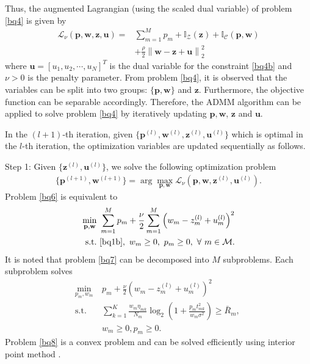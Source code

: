 \documentclass[journal]{IEEEtran}
\begin{document}
Thus, the augmented Lagrangian (using the scaled dual variable) of problem \eqref{bq4} is given by
\begin{align}
\mathcal{L}_\nu\left(\mathbf{p},\mathbf{w}, \mathbf{z},\mathbf{u}\right)=& \sum\limits_{m=1}^{M} p_m + \mathbb{I}_\mathcal{Z}\left(\mathbf{z}\right) + \mathbb{I}_\mathcal{C}\left(\mathbf{p},\mathbf{w}\right)\nonumber \\ & +\frac{\rho}{2}\left\|\mathbf{w} - \mathbf{z} + \mathbf{u}\right\|_2^2
\end{align}
where $\mathbf{u} = [u_1, u_2, \cdots, u_N]^T$ is the dual variable for the  constraint \eqref{bq4b} and $\nu>0$ is the penalty parameter. From problem \eqref{bq4}, it is observed that the variables can be split into two groups: $\{\mathbf{p}, \mathbf{w}\}$ and $\mathbf{z}$. Furthermore, the objective function can be separable accordingly. Therefore, the ADMM algorithm can be applied to solve problem \eqref{bq4} by iteratively updating $\mathbf{p}, \mathbf{w}$, $\mathbf{z}$ and $\mathbf{u}$.

In the $(l+1)$-th iteration, given $\{\mathbf{p}^{(l)}, \mathbf{w}^{(l)}, \mathbf{z}^{(l)}, \mathbf{u}^{(l)}\}$ which is optimal in the $l$-th iteration, the optimization variables are updated sequentially as follows.

Step 1: Given $\{\mathbf{z}^{(l)}, \mathbf{u}^{(l)}\}$, we solve the following optimization problem
\begin{align}\label{bq6}
\{\mathbf{p}^{(l+1)}, \mathbf{w}^{(l+1)}\} = \arg \max_{\mathbf{p}, \mathbf{w}} \mathcal{L}_\nu\left(\mathbf{p}, \mathbf{w}, \mathbf{z}^{(l)}, \mathbf{u}^{(l)}\right).
\end{align}
Problem \eqref{bq6} is equivalent to
\begin{align}\label{bq7}
\min_{\mathbf{p}, \mathbf{w}}\ & \sum\limits_{m=1}^{M} p_m + \frac{\nu}{2}\sum\limits_{m=1}^{M}\left(w_m-z_m^{(l)}+u_m^{(l)}\right)^2 \nonumber\\ \mbox{s.t.}\ &  \eqref{bq1b},\ w_m\geq 0,\ p_m\geq 0,\ \forall\ m\in\mathcal{M}.
\end{align}
It is noted that problem \eqref{bq7} can be decomposed into $M$ subproblems. Each subproblem solves
\begin{align}\label{bq8}
\min_{p_m, w_m}\ & p_m+\frac{\nu}{2}\left(w_m-z_m^{(l)}+u_m^{(l)}\right)^2 \nonumber\\
\mbox{s.t.} \ & \sum\limits_{k= 1}^{K}\frac{w_m \eta_{mk}}{N_m}\log_2\left(1 + \frac{p_mt_{mk}^2}{w_m\sigma^2}\right)\geq \bar{R}_m,\ \nonumber\\
& w_m\geq 0, p_m\geq 0.
\end{align}
Problem \eqref{bq8} is a convex problem and can be solved efficiently using interior point method \cite{SBoyd1}.
\end{document}

